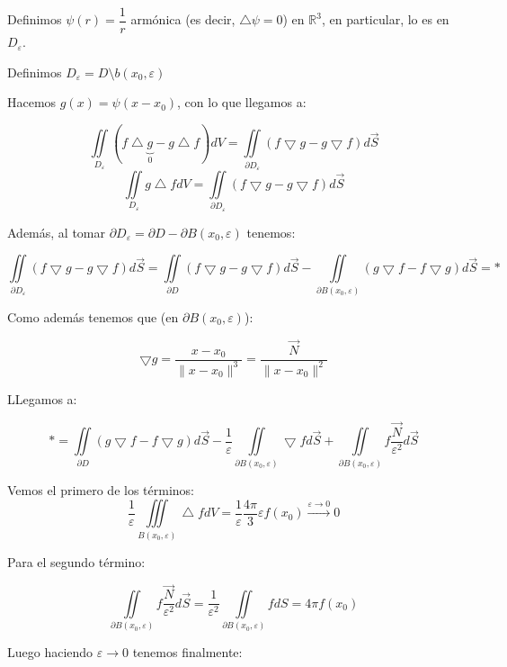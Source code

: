 \documentclass[openany]{book}
\begin{document}
Definimos $ \psi (r) = \dfrac{1}{r} $ armónica (es decir, $\bigtriangleup \psi = 0$) en $ \mathbb{R}^3 $, en particular, lo es en $ D_{\varepsilon} $.

Definimos $ D_{\varepsilon} = D \setminus b(x_0,\varepsilon) $

Hacemos $ g(x) = \psi(x-x_0) $, con lo que llegamos a:

$$ \iint\limits_{D_{\varepsilon}} (f \bigtriangleup \underbrace{g}_{0} - g\bigtriangleup f)dV = \iint\limits_{\partial D_{\varepsilon}} (f\bigtriangledown g-g \bigtriangledown f)d\overrightarrow{S}$$
$$ \iint\limits_{D_{\varepsilon}} g\bigtriangleup fdV = \iint\limits_{\partial D_{\varepsilon}} (f\bigtriangledown g-g \bigtriangledown f)d\overrightarrow{S}$$

Además, al tomar $ \partial D_{\varepsilon} = \partial D- \partial B(x_0,\varepsilon) $ tenemos:

$$ \iint\limits_{\partial D_{\varepsilon}} (f\bigtriangledown g-g \bigtriangledown f)d\overrightarrow{S} = \iint\limits_{\partial D} (f\bigtriangledown g-g \bigtriangledown f)d\overrightarrow{S} - \iint\limits_{\partial B(x_0,\varepsilon)}(g \bigtriangledown f-f\bigtriangledown g)d\overrightarrow{S} = *$$

Como además tenemos que (en $ \partial B(x_0,\varepsilon) $):

$$ \bigtriangledown g = \dfrac{x-x_0}{\|x-x_0\|^3} = \dfrac{\overrightarrow{N}}{\|x-x_0\|^2} $$

LLegamos a:



$$ *= \iint\limits_{\partial D}(g \bigtriangledown f-f\bigtriangledown g )d \overrightarrow{S} -\dfrac{1}{\varepsilon} \iint\limits_{\partial B(x_0,\varepsilon)}\bigtriangledown f d\overrightarrow{S} + \iint\limits_{\partial B(x_0,\varepsilon)} f \dfrac{\overrightarrow{N}}{\varepsilon^2}d\overrightarrow{S} $$

Vemos el primero de los términos:
$$ \dfrac{1}{\varepsilon} \iiint\limits_{B(x_0,\varepsilon)}\bigtriangleup f dV = \dfrac{1}{\varepsilon} \dfrac{4 \pi}{3} \varepsilon f(x_0) \xrightarrow[]{\varepsilon \to 0} 0  $$

Para el segundo término:

$$ \iint\limits_{\partial B(x_0,\varepsilon)} f \dfrac{\overrightarrow{N}}{\varepsilon^2}d\overrightarrow{S} = \dfrac{1}{\varepsilon^2} \iint\limits_{\partial B(x_0,\varepsilon)} fdS = 4 \pi f(x_0) $$


Luego haciendo $ \varepsilon \to 0 $ tenemos finalmente:
\end{document}
